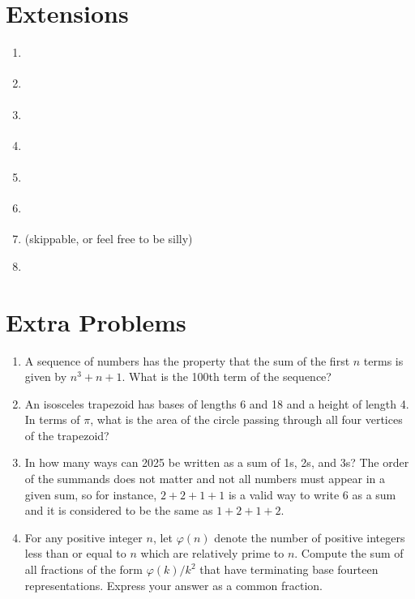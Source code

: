 \documentclass{article}
\begin{document}
\section*{Extensions}
\vspace{1cm}
\begin{enumerate}
\item \underline{\hspace{3in}}\vspace{1cm}
\item \underline{\hspace{3in}}\vspace{1cm}
\item \underline{\hspace{3in}}\vspace{1cm}
\item \underline{\hspace{3in}}\vspace{1cm}
\item \underline{\hspace{3in}}\vspace{1cm}
\item \underline{\hspace{3in}}\vspace{1cm}
\item \underline{\hspace{3in}} (skippable, or feel free to be silly)\vspace{1cm}
\item \underline{\hspace{3in}}
\end{enumerate}


\newpage

\section*{Extra Problems}

\begin{enumerate}
\item A sequence of numbers has the property that the sum of the first $n$ terms is given by $n^3 + n + 1$. What is the 100th term of the sequence?\vspace{3cm}
\item An isosceles trapezoid has bases of lengths 6 and 18 and a height of length 4. In terms of $\pi$, what is the area of the circle passing through all four vertices of the trapezoid?\vspace{3cm}
\item In how many ways can 2025 be written as a sum of 1s, 2s, and 3s? The order of the summands does not matter and not all numbers must appear in a given sum, so for instance, $2 + 2 + 1 + 1$ is a valid way to write $6$ as a sum and it is considered to be the same as $1 + 2 + 1 + 2$.\vspace{3cm}
\item For any positive integer $n$, let $\varphi(n)$ denote the number of positive integers less than or equal to $n$ which are relatively prime to $n$. Compute the sum of all fractions of the form $\varphi(k)/k^2$ that have terminating base fourteen representations. Express your answer as a common fraction.
\end{enumerate}
\end{document}
